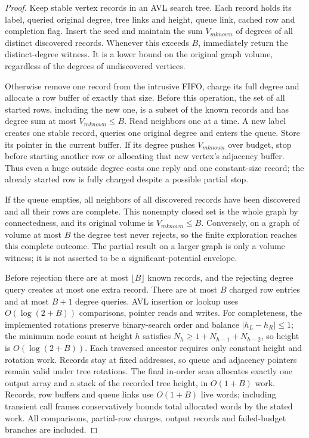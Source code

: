 \begin{proof}
Keep stable vertex records in an AVL search tree. Each record holds
its label, queried original degree, tree links and height, queue link,
cached row and completion flag. Insert the seed and maintain the sum
$V_{
m known}$ of degrees of all distinct discovered records. Whenever
this exceeds $B$, immediately return the distinct-degree witness.
It is a lower bound on the original graph volume, regardless of the
degrees of undiscovered vertices.

Otherwise remove one record from the intrusive FIFO, charge its full
degree and allocate a row buffer of exactly that size. Before this
operation, the set of all started rows, including the new one, is a
subset of the known records and has degree sum at most
$V_{
m known}\leq B$. Read neighbors one at a time. A new label
creates one stable record, queries one original degree and enters the
queue. Store its pointer in the current buffer. If its degree pushes
$V_{
m known}$ over budget, stop before starting another row or
allocating that new vertex's adjacency buffer. Thus even a huge outside
degree costs one reply and one constant-size record; the already
started row is fully charged despite a possible partial stop.

If the queue empties, all neighbors of all discovered records have
been discovered and all their rows are complete. This nonempty closed
set is the whole graph by connectedness, and its original volume is
$V_{
m known}\leq B$. Conversely, on a graph of volume at most $B$
the degree test never rejects, so the finite exploration reaches this
complete outcome. The partial result on a larger graph is only a
volume witness; it is not asserted to be a significant-potential envelope.

Before rejection there are at most $\lfloor B\rfloor$ known records,
and the rejecting degree query creates at most one extra record.
There are at most $B$ charged row entries and at most $B+1$ degree
queries. AVL insertion or lookup uses $O(\log(2+B))$ comparisons,
pointer reads and writes. For completeness, the implemented rotations
preserve binary-search order and balance $|h_L-h_R|\leq1$; the minimum
node count at height $h$ satisfies
$N_h\geq1+N_{h-1}+N_{h-2}$, so height is $O(\log(2+B))$.
Each traversed ancestor requires only constant height and rotation work.
Records stay at fixed addresses, so queue and adjacency pointers remain
valid under tree rotations. The final in-order scan allocates exactly
one output array and a stack of the recorded tree height, in $O(1+B)$
work. Records, row buffers and queue links use $O(1+B)$ live words;
including transient call frames conservatively bounds total allocated
words by the stated work. All comparisons, partial-row charges, output
records and failed-budget branches are included.
\end{proof}

